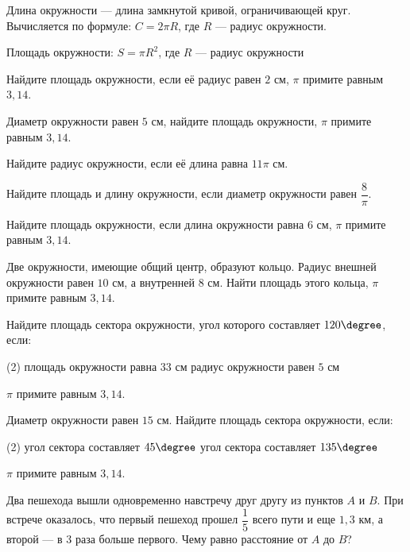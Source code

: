 \begin{class}[number=5]
	\begin{definit}
		Длина окружности --- длина замкнутой кривой, ограничивающей круг. Вычисляется по формуле: \( C = 2 \pi R \), где \(R\) --- радиус окружности.
	\end{definit}
	\begin{definit}
		Площадь окружности: \( S = \pi R^2 \), где \(R\) --- радиус окружности
	\end{definit}
	\begin{listofex}
		\item Найдите площадь окружности, если её радиус равен \( 2 \) см, \(\pi\) примите равным \(3,14\).
		\item Диаметр окружности равен \(5\) см, найдите площадь окружности, \(\pi\) примите равным \(3,14\).
		\item Найдите радиус окружности, если её длина равна \( 11\pi \) см.
		\item Найдите площадь и длину окружности, если диаметр окружности равен \( \dfrac{8}{\pi} \).
		\item Найдите площадь окружности, если длина окружности равна \(6\) см, \(\pi\) примите равным \(3,14\).
		\item Две окружности, имеющие общий центр, образуют кольцо. Радиус внешней окружности равен \(10\) см, а внутренней \(8\) см. Найти площадь этого кольца, \(\pi\) примите равным \(3,14\).
		
		\item Найдите площадь сектора окружности, угол которого составляет \(120 \degree\), если:
		\begin{tasks}(2)
			\task площадь окружности равна \( 33 \) см
			\task радиус окружности равен \( 5 \) см
		\end{tasks}
		\(\pi\) примите равным \(3,14\).
		\item Диаметр окружности равен \(15\) см. Найдите площадь сектора окружности, если:
		\begin{tasks}(2)
			\task угол сектора составляет \( 45 \degree \)
			\task угол сектора составляет \( 135 \degree \)
		\end{tasks}
		\(\pi\) примите равным \(3,14\).
		\item Два пешехода вышли одновременно навстречу друг другу из пунктов \(A\) и \(B\). При встрече оказалось, что первый пешеход прошел \(\dfrac{ 1 }{ 5 }\) всего пути и еще \(1,3\) км, а второй --- в \(3\) раза больше первого. Чему равно расстояние от \(A\) до \(B\)?
		
	\end{listofex}
\end{class}

